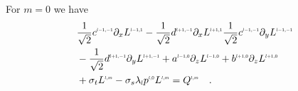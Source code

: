 \documentclass{egpubl}
\begin{document}
For $m=0$ we have
\begin{align}
&
\frac{1}{\sqrt{2}}c^{\scaleto{l-1,-1}{4pt}}\partial_x L^{\scaleto{l-1,1}{4pt}}
-\frac{1}{\sqrt{2}}d^{\scaleto{l+1,-1}{4pt}}\partial_x L^{\scaleto{l+1,1}{4pt}}
\frac{1}{\sqrt{2}}c^{\scaleto{l-1,-1}{4pt}}\partial_y L^{\scaleto{l-1,-1}{4pt}}
\nonumber
\\&
-\frac{1}{\sqrt{2}}d^{\scaleto{l+1,-1}{4pt}}\partial_y L^{\scaleto{l+1,-1}{4pt}}
+a^{\scaleto{l-1,0}{4pt}}\partial_z L^{\scaleto{l-1,0}{4pt}}
+b^{\scaleto{l+1,0}{4pt}}\partial_z L^{\scaleto{l+1,0}{4pt}}
\nonumber
\\&
+\sigma_t L^{\scaleto{l,m}{4pt}}
-\sigma_s\lambda_{\scaleto{l}{4pt}}p^{\scaleto{l,0}{4pt}}L^{\scaleto{l,m}{4pt}}
= Q^{\scaleto{l,m}{4pt}}\quad .
\label{eq:rpn_m_=_z}
\end{align}
\end{document}
